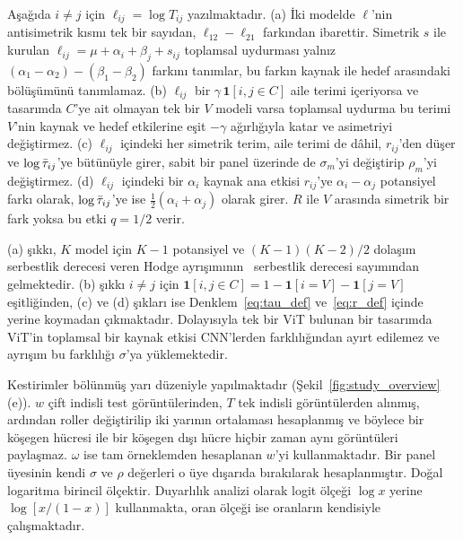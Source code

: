 \begin{proposition}[Tanımlanabilirlik]
\label{prop:identifiability}
Aşağıda $i \neq j$ için $\ell_{ij} = \log T_{ij}$ yazılmaktadır. (a) İki modelde $\ell$'nin antisimetrik kısmı tek bir sayıdan, $\ell_{12} - \ell_{21}$ farkından ibarettir. Simetrik $s$ ile kurulan $\ell_{ij} = \mu + \alpha_i + \beta_j + s_{ij}$ toplamsal uydurması yalnız $(\alpha_1 - \alpha_2) - (\beta_1 - \beta_2)$ farkını tanımlar, bu farkın kaynak ile hedef arasındaki bölüşümünü tanımlamaz. (b) $\ell_{ij}$ bir $\gamma\,\mathbf{1}[i,j \in C]$ aile terimi içeriyorsa ve tasarımda $C$'ye ait olmayan tek bir $V$ modeli varsa toplamsal uydurma bu terimi $V$'nin kaynak ve hedef etkilerine eşit $-\gamma$ ağırlığıyla katar ve asimetriyi değiştirmez. (c) $\ell_{ij}$ içindeki her simetrik terim, aile terimi de dâhil, $r_{ij}$'den düşer ve $\log\bar{\tau}_{ij}$'ye bütünüyle girer, sabit bir panel üzerinde de $\sigma_m$'yi değiştirip $\rho_m$'yi değiştirmez. (d) $\ell_{ij}$ içindeki bir $\alpha_i$ kaynak ana etkisi $r_{ij}$'ye $\alpha_i - \alpha_j$ potansiyel farkı olarak, $\log\bar{\tau}_{ij}$'ye ise $\tfrac12(\alpha_i+\alpha_j)$ olarak girer. $R$ ile $V$ arasında simetrik bir fark yoksa bu etki $q = 1/2$ verir.
\end{proposition}

(a) şıkkı, $K$ model için $K-1$ potansiyel ve $(K-1)(K-2)/2$ dolaşım serbestlik derecesi veren Hodge ayrışımının~\cite{jiang2011statistical} serbestlik derecesi sayımından gelmektedir. (b) şıkkı $i\neq j$ için $\mathbf{1}[i,j\in C] = 1 - \mathbf{1}[i=V] - \mathbf{1}[j=V]$ eşitliğinden, (c) ve (d) şıkları ise Denklem~\eqref{eq:tau_def} ve~\eqref{eq:r_def} içinde yerine koymadan çıkmaktadır. Dolayısıyla tek bir ViT bulunan bir tasarımda ViT'in toplamsal bir kaynak etkisi CNN'lerden farklılığından ayırt edilemez ve ayrışım bu farklılığı $\sigma$'ya yüklemektedir.

Kestirimler bölünmüş yarı düzeniyle yapılmaktadır (Şekil~\ref{fig:study_overview}(e)). $w$ çift indisli test görüntülerinden, $T$ tek indisli görüntülerden alınmış, ardından roller değiştirilip iki yarının ortalaması hesaplanmış ve böylece bir köşegen hücresi ile bir köşegen dışı hücre hiçbir zaman aynı görüntüleri paylaşmaz. $\omega$ ise tam örneklemden hesaplanan $w$'yi kullanmaktadır. Bir panel üyesinin kendi $\sigma$ ve $\rho$ değerleri o üye dışarıda bırakılarak hesaplanmıştır. Doğal logaritma birincil ölçektir. Duyarlılık analizi olarak logit ölçeği $\log x$ yerine $\log[x/(1-x)]$ kullanmakta, oran ölçeği ise oranların kendisiyle çalışmaktadır.


